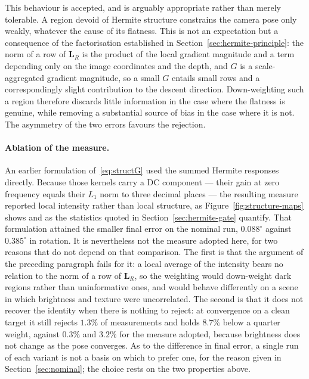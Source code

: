 This behaviour is accepted, and is arguably appropriate rather than merely
tolerable. A region devoid of Hermite structure constrains the camera pose
only weakly, whatever the cause of its flatness. This is not an expectation
but a consequence of the factorisation established in
Section~\ref{sec:hermite-principle}: the norm of a row of $\mathbf{L}_{R}$ is
the product of the local gradient magnitude and a term depending only on the
image coordinates and the depth, and $G$ is a scale-aggregated gradient
magnitude, so a small $G$ entails small rows and a correspondingly slight
contribution to the descent direction. Down-weighting such a region therefore
discards little information in the case where the flatness is genuine, while
removing a substantial source of bias in the case where it is not. The
asymmetry of the two errors favours the rejection.

\paragraph{Ablation of the measure.}
An earlier formulation of~\eqref{eq:structG} used the summed Hermite
responses directly. Because those kernels carry a DC component --- their gain
at zero frequency equals their $L_{1}$ norm to three decimal places --- the
resulting measure reported local intensity rather than local structure, as
Figure~\ref{fig:structure-maps} shows and as the statistics quoted in
Section~\ref{sec:hermite-gate} quantify. That formulation attained the
smaller final error on the nominal run, $0.088^{\circ}$ against
$0.385^{\circ}$ in rotation. It is nevertheless not the measure adopted here,
for two reasons that do not depend on that comparison. The first is that the
argument of the preceding paragraph fails for it: a local average of the
intensity bears no relation to the norm of a row of $\mathbf{L}_{R}$, so the
weighting would down-weight dark regions rather than uninformative ones, and
would behave differently on a scene in which brightness and texture were
uncorrelated. The second is that it does not recover the identity when there
is nothing to reject: at convergence on a clean target it still rejects
$1.3\%$ of measurements and holds $8.7\%$ below a quarter weight, against
$0.3\%$ and $3.2\%$ for the measure adopted, because brightness does not
change as the pose converges. As to the difference in final error, a single
run of each variant is not a basis on which to prefer one, for the reason
given in Section~\ref{sec:nominal}; the choice rests on the two properties
above.

